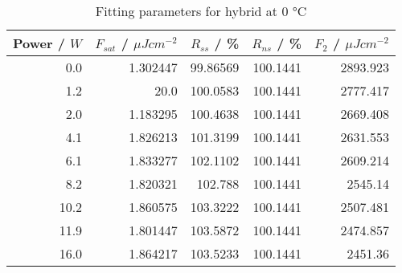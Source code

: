 \begin{table}[H]
\caption{Fitting parameters for hybrid at $0$ °C}
\begin{tabular}{rrrrr}
\toprule
Power / $W$ & $F_{sat}$ / $\mu Jcm^{-2}$ & $R_{ss}$ / \% & $R_{ns}$ / \% & $F_2$ / $\mu Jcm^{-2}$ \\
\midrule
0.0 & 1.302447 & 99.86569 & 100.1441 & 2893.923 \\
1.2 & 20.0 & 100.0583 & 100.1441 & 2777.417 \\
2.0 & 1.183295 & 100.4638 & 100.1441 & 2669.408 \\
4.1 & 1.826213 & 101.3199 & 100.1441 & 2631.553 \\
6.1 & 1.833277 & 102.1102 & 100.1441 & 2609.214 \\
8.2 & 1.820321 & 102.788 & 100.1441 & 2545.14 \\
10.2 & 1.860575 & 103.3222 & 100.1441 & 2507.481 \\
11.9 & 1.801447 & 103.5872 & 100.1441 & 2474.857 \\
16.0 & 1.864217 & 103.5233 & 100.1441 & 2451.36 \\
\bottomrule
\end{tabular}
\end{table}

